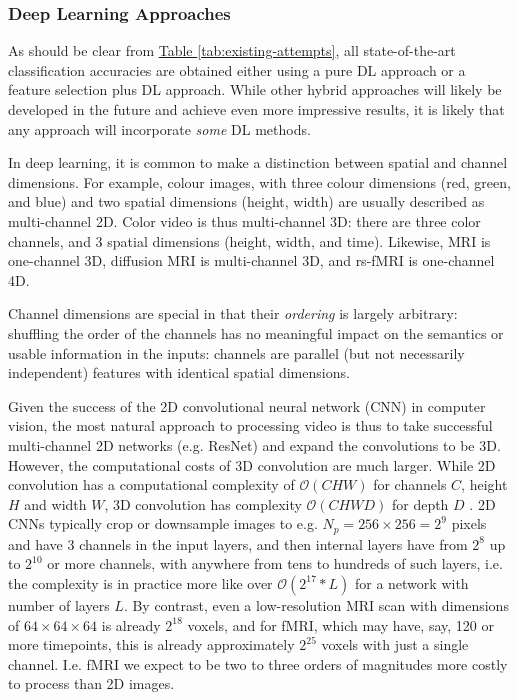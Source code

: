 \documentclass[10pt]{article}
\begin{document}
\subsubsection{Deep Learning Approaches}

As should be clear from \hyperref[tab:existing-attempts]{Table \ref{tab:existing-attempts}}, all
state-of-the-art classification accuracies are obtained either using a pure DL approach or a feature
selection plus DL approach. While other hybrid approaches will likely be developed in the future and
achieve even more impressive results, it is likely that any approach will incorporate \emph{some} DL
methods.

In deep learning, it is common to make a distinction between spatial and channel dimensions. For
example, colour images, with three colour dimensions (red, green, and blue) and two spatial
dimensions (height, width) are usually described as multi-channel 2D. Color video is thus
multi-channel 3D: there are three color channels, and 3 spatial dimensions (height, width, and
time). Likewise, MRI is one-channel 3D, diffusion MRI is multi-channel 3D, and rs-fMRI is
one-channel 4D.

Channel dimensions are special in that their \emph{ordering} is largely arbitrary: shuffling
the order of the channels has no meaningful impact on the semantics or usable information in the
inputs: channels are parallel (but not necessarily independent) features with identical spatial
dimensions.

Given the success of the 2D convolutional neural network (CNN) in computer vision, the most natural
approach to processing video is thus to take successful multi-channel 2D networks (e.g. ResNet) and
expand the convolutions to be 3D. However, the computational costs of 3D convolution are much
larger. While 2D convolution has a computational complexity of \(\mathcal{O}(CHW)\) for channels
\(C\), height \(H\) and width \(W\), 3D convolution has complexity \(\mathcal{O}(CHWD)\) for depth
\(D\) \citep{tranVideoClassificationChannelSeparated2019}. 2D CNNs typically crop or downsample
images to e.g. \(N_p = 256\times256 = 2^9\) pixels and have 3 channels in the input layers, and then
internal layers have from \(2^8\) up to \(2^{10}\) or more channels, with anywhere from tens to
hundreds of such layers, i.e. the complexity is in practice more like over \(\mathcal{O}(2^{17} * L)\)
for a network with number of layers \(L\). By contrast, even a low-resolution MRI scan with
dimensions of \(64 \times 64 \times 64\) is already \(2^{18}\) voxels, and for fMRI, which may have, say,
120 or more timepoints, this is already approximately \(2^{25}\) voxels with just a single channel.
I.e. fMRI we expect to be two to three orders of magnitudes more costly to process than 2D images.
\end{document}
